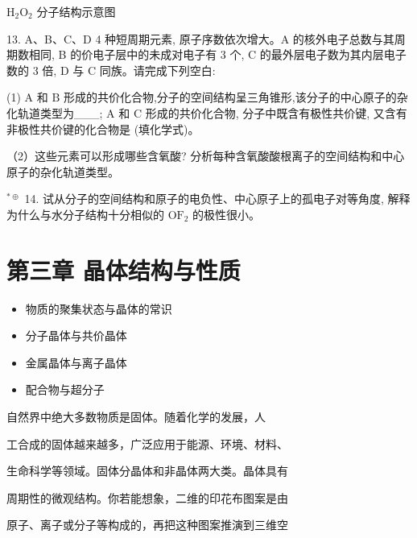 \documentclass[10pt]{article}
\begin{document}
\({\mathrm{H}}_{2}{\mathrm{O}}_{2}\) 分子结构示意图

13. A、B、C、D 4 种短周期元素, 原子序数依次增大。A 的核外电子总数与其周期数相同, B 的价电子层中的未成对电子有 3 个, C 的最外层电子数为其内层电子数的 3 倍, D 与 C 同族。请完成下列空白:

(1) \(\mathrm{A}\) 和 \(\mathrm{B}\) 形成的共价化合物,分子的空间结构呈三角锥形,该分子的中心原子的杂化轨道类型为\_\_\_; A 和 C 形成的共价化合物, 分子中既含有极性共价键, 又含有非极性共价键的化合物是 (填化学式)。

（2）这些元素可以形成哪些含氧酸? 分析每种含氧酸酸根离子的空间结构和中心原子的杂化轨道类型。

\({}^{* \oplus }\) 14. 试从分子的空间结构和原子的电负性、中心原子上的孤电子对等角度, 解释为什么与水分子结构十分相似的 \({\mathrm{{OF}}}_{2}\) 的极性很小。


\section*{第三章 晶体结构与性质}

\begin{itemize}
\item 物质的聚集状态与晶体的常识
\end{itemize}

\begin{itemize}
\item 分子晶体与共价晶体
\end{itemize}

\begin{itemize}
\item 金属晶体与离子晶体
\end{itemize}

\begin{itemize}
\item 配合物与超分子
\end{itemize}

自然界中绝大多数物质是固体。随着化学的发展，人

工合成的固体越来越多，广泛应用于能源、环境、材料、

生命科学等领域。固体分晶体和非晶体两大类。晶体具有

周期性的微观结构。你若能想象，二维的印花布图案是由

原子、离子或分子等构成的，再把这种图案推演到三维空
\end{document}
